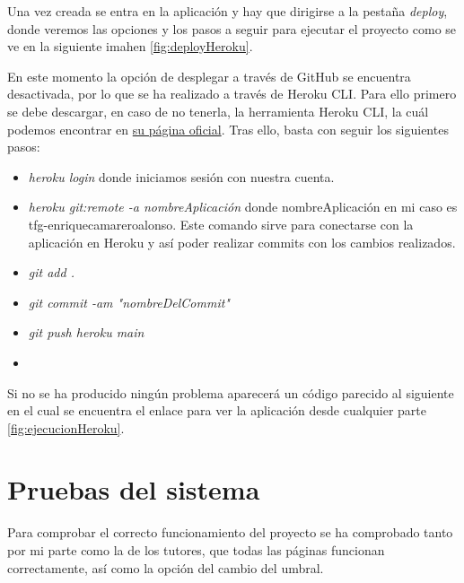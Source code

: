 Una vez creada se entra en la aplicación y hay que dirigirse a la pestaña \textit{deploy}, donde veremos las opciones y los pasos a seguir para ejecutar el proyecto como se ve en la siguiente imahen \ref{fig:deployHeroku}.


En este momento la opción de desplegar a través de GitHub se encuentra desactivada, por lo que se ha realizado a través de Heroku CLI. Para ello primero se debe descargar, en caso de no tenerla, la herramienta Heroku CLI, la cuál podemos encontrar en \href{https://devcenter.heroku.com/articles/heroku-cli}{su página oficial}. Tras ello, basta con seguir los siguientes pasos:

\begin{itemize}
    \item \textit{heroku login} donde iniciamos sesión con nuestra cuenta.
    \item \textit{heroku git:remote -a nombreAplicación} donde nombreAplicación en mi caso es tfg-enriquecamareroalonso. Este comando sirve para conectarse con la aplicación en Heroku y así poder realizar commits con los cambios realizados.
    \item \textit{git add .}
    \item \textit{git commit -am "nombreDelCommit"}
    \item \textit{git push heroku main}
    \item 
\end{itemize}

Si no se ha producido ningún problema aparecerá un código parecido al siguiente en el cual se encuentra el enlace para ver la aplicación desde cualquier parte \ref{fig:ejecucionHeroku}.



\section{Pruebas del sistema}
Para comprobar el correcto funcionamiento del proyecto se ha comprobado tanto por mi parte como la de los tutores, que todas las páginas funcionan correctamente, así como la opción del cambio del umbral.